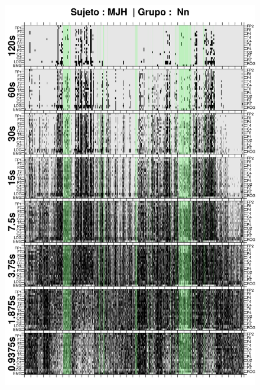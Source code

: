 
\begin{figure}
\centering
\includegraphics[width=0.9\linewidth]
{./img_ejemplos/MJNNVIGILOS_comp_est_.png} 
\end{figure}

